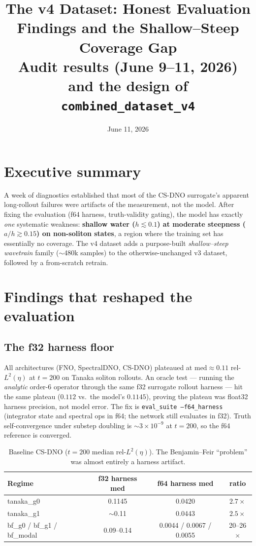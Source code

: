 \documentclass[11pt,letterpaper]{article}
\title{\textbf{The v4 Dataset: Honest Evaluation Findings and the Shallow--Steep Coverage Gap}\\[2pt]
       \large Audit results (June 9--11, 2026) and the design of \texttt{combined\_dataset\_v4}}
\author{}
\date{June 11, 2026}
\newcommand{\relmed}{\mathrm{med}}
\begin{document}
\maketitle

\section*{Executive summary}

A week of diagnostics established that most of the CS-DNO surrogate's apparent
long-rollout failures were artifacts of the measurement, not the model. After
fixing the evaluation (f64 harness, truth-validity gating), the model has
exactly \emph{one} systematic weakness: \textbf{shallow water ($h \lesssim 0.1$)
at moderate steepness ($a/h \gtrsim 0.15$) on non-soliton states}, a region
where the training set has essentially no coverage. The v4 dataset adds a
purpose-built \emph{shallow--steep wavetrain} family ($\sim$480k samples) to the
otherwise-unchanged v3 dataset, followed by a from-scratch retrain.

\section{Findings that reshaped the evaluation}

\subsection{The f32 harness floor}

All architectures (FNO, SpectralDNO, CS-DNO) plateaued at
$\relmed \approx 0.11$ rel-$L^2(\eta)$ at $t=200$ on Tanaka soliton rollouts.
An oracle test --- running the \emph{analytic} order-6 operator through the same
f32 surrogate rollout harness --- hit the same plateau ($0.112$ vs.\ the model's
$0.1145$), proving the plateau was float32 harness precision, not model error.
The fix is \texttt{eval\_suite --f64\_harness} (integrator state and spectral
ops in f64; the network still evaluates in f32). Truth self-convergence under
substep doubling is $\sim 3\times 10^{-9}$ at $t=200$, so the f64 reference is
converged.

\begin{table}[h]
\centering
\small
\begin{tabular}{lccc}
\toprule
Regime & f32 harness med & f64 harness med & ratio \\
\midrule
tanaka\_g0 & 0.1145 & 0.0420 & $2.7\times$ \\
tanaka\_g1 & $\sim$0.11 & 0.0443 & $2.5\times$ \\
bf\_g0 / bf\_g1 / bf\_modal & 0.09--0.14 & 0.0044 / 0.0067 / 0.0055 & 20--26$\times$ \\
\bottomrule
\end{tabular}
\caption{Baseline CS-DNO ($t=200$ median rel-$L^2(\eta)$). The Benjamin--Feir
``problem'' was almost entirely a harness artifact.}
\end{table}
\end{document}
